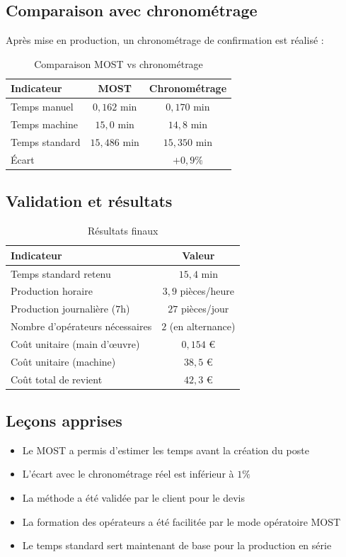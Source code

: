 \documentclass[a4paper,12pt]{article}
\begin{document}
\subsection{Comparaison avec chronométrage}

Après mise en production, un chronométrage de confirmation est réalisé :

\begin{table}[ht]
\centering
\begin{tabular}{|l|c|c|}
\hline
\textbf{Indicateur} & \textbf{MOST} & \textbf{Chronométrage} \\
\hline
Temps manuel & $0,162$ min & $0,170$ min \\
Temps machine & $15,0$ min & $14,8$ min \\
Temps standard & $15,486$ min & $15,350$ min \\
Écart & & $+0,9\%$ \\
\hline
\end{tabular}
\caption{Comparaison MOST vs chronométrage}
\end{table}

\subsection{Validation et résultats}

\begin{table}[ht]
\centering
\begin{tabular}{|l|c|}
\hline
\textbf{Indicateur} & \textbf{Valeur} \\
\hline
Temps standard retenu & $15,4$ min \\
Production horaire & $3,9$ pièces/heure \\
Production journalière ($7$h) & $27$ pièces/jour \\
Nombre d'opérateurs nécessaires & $2$ (en alternance) \\
Coût unitaire (main d'œuvre) & $0,154$ € \\
Coût unitaire (machine) & $38,5$ € \\
Coût total de revient & $42,3$ € \\
\hline
\end{tabular}
\caption{Résultats finaux}
\end{table}

\subsection{Leçons apprises}

\begin{itemize}
    \item Le MOST a permis d'estimer les temps avant la création du poste
    \item L'écart avec le chronométrage réel est inférieur à $1\%$
    \item La méthode a été validée par le client pour le devis
    \item La formation des opérateurs a été facilitée par le mode opératoire MOST
    \item Le temps standard sert maintenant de base pour la production en série
\end{itemize}
\end{document}
